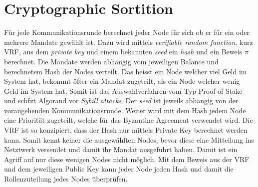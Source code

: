 \documentclass[11pt,a4paper]{article}
\begin{document}
\section*{Cryptographic Sortition}
F\"ur jede Kommunikationsrunde berechnet jeder Node f\"ur sich ob er f\"ur ein oder mehrere Mandate gew\"ahlt ist.
Dazu wird mittels \textit{verifiable random function}, kurz VRF, aus dem \textit{private key} und einem bekannten \textit{seed} ein \textit{hash} und ein Beweis $\pi$ berechnet.
Die Mandate werden abh\"angig vom jeweiligen Balance und berechnetem Hash der Nodes verteilt.
Das heisst ein Node welcher viel Geld im System hat, bekommt \"ofter ein Mandat zugeteilt, als ein Node welcher wenig Geld im System hat.
Somit ist das Auswahlverfahren vom Typ Proof-of-Stake und sch\"tzt Algorand vor \textit{Sybill attacks}.
Der \textit{seed} ist jeweils abh\"angig von der vorangehenden Kommunikationsrunde.
Weiter wird mit dem Hash jedem Node eine Priorit\"at zugeteilt, welche f\"ur das Byzantine Agreement verwendet wird.
Die VRF ist so konzipiert, dass der Hash nur mittels Private Key berechnet werden kann.
Somit kennt keiner die ausgew\"ahlten Nodes, bevor diese eine Mitteilung ins Netztwerk versendet und
damit ihr Mandat ausgef\"uhrt haben.
Damit ist ein Agriff auf nur diese wenigen Nodes nicht m\"oglich.
Mit dem Beweis aus der VRF und dem jeweiligen Public Key kann jeder Node jeden Hash und damit die Rollenzuteilung jedes Nodes \"uberpr\"ufen.

\end{document}
